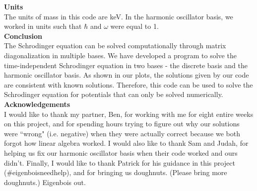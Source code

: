 \documentclass[%
 reprint,
 amsmath,amssymb,
 aps,
]{revtex4-1}
\begin{document}
\noindent \textbf{Units}\\

\noindent The units of mass in this code are keV.  In the harmonic oscillator basis, we worked in units such that $\hbar$ and $\omega$ were equal to 1.\\

\noindent \textbf{Conclusion}\\

\noindent The Schrodinger equation can be solved computationally through matrix diagonalization in multiple bases.  We have developed a program to solve the time-independent Schrodinger equation in two bases - the discrete basis and the harmonic oscillator basis.  As shown in our plots, the solutions given by our code are consistent with known solutions.  Therefore, this code can be used to solve the Schrodinger equation for potentials that can only be solved numerically.\\

\noindent \textbf{Acknowledgements}\\

\noindent I would like to thank my partner, Ben, for working with me for eight entire weeks on this project, and for spending hours trying to figure out why our solutions were ``wrong" (i.e. negative) when they were actually correct because we both forgot how linear algebra worked.  I would also like to thank Sam and Judah, for helping us fix our harmonic oscillator basis when their code worked and ours didn't.  Finally, I would like to thank Patrick for his guidance in this project (\#eigenboisneedhelp), and for bringing us doughnuts.  (Please bring more doughnuts.)  Eigenbois out.
\end{document}
